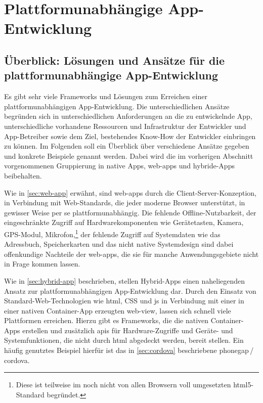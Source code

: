 \chapter{Plattformunabhängige App-Entwicklung}

\section[Überblick: Lösungen und Ansätze]{Überblick: Lösungen und Ansätze für die platt\-form\-un\-ab\-hängige App-Entwicklung} \label{sec:overview}

Es gibt sehr viele Frameworks und Lösungen zum Erreichen einer plattformunabhängigen App-Entwicklung. Die unterschiedlichen Ansätze begründen sich in unterschiedlichen Anforderungen an die zu entwickelnde App, unterschiedliche vorhandene Ressourcen und Infrastruktur der Entwickler und App-Betreiber sowie dem Ziel, bestehendes Know-How der Entwickler einbringen zu können.
Im Folgenden soll ein Überblick über verschiedene Ansätze gegeben und konkrete Beispiele genannt werden. Dabei wird die im vorherigen Abschnitt vorgenommenen Gruppierung in native Apps, \glspl{web-app} und hybride-Apps beibehalten.

Wie in \autoref{sec:web-app} erwähnt, sind \glspl{web-app} durch die Client-Server-Konzeption, in Verbindung mit Web-Standards, die jeder moderne Browser unterstützt, in gewisser Weise per se plattformunabhängig. Die fehlende Offline-Nutzbarkeit, der eingeschränkte Zugriff auf Hardwarekomponenten wie Gerätetasten, Kamera, GPS-Modul, Mikrofon,\footnote{Diese ist teilweise im noch nicht von allen Browsern voll umgesetzten \gls{html5}-Standard begründet.} der fehlende Zugriff auf Systemdaten wie das Adressbuch, Speicherkarten und das nicht native Systemdesign sind dabei offenkundige Nachteile der \glspl{web-app}, die sie für manche Anwendungsgebiete nicht in Frage kommen lassen.

Wie in \autoref{sec:hybrid-app} beschrieben, stellen Hybrid-Apps einen naheliegenden Ansatz zur plattformunabhängigen App-Entwicklung dar. Durch den Einsatz von Standard-Web-Technologien wie \gls{html}, CSS und \gls{js} in Verbindung mit einer in einer nativen Container-App erzeugten \gls{web-view}, lassen sich schnell viele Plattformen erreichen. Hierzu gibt es Frameworks, die die nativen Container-Apps erstellen und zusätzlich \glspl{api} für Hardware-Zugriffe und Geräte- und Systemfunktionen, die nicht durch \gls{html} abgedeckt werden, bereit stellen. Ein häufig genutztes Beispiel hierfür ist das in \autoref{sec:cordova} beschriebene \gls{phonegap}\,/\,\gls{cordova}.

